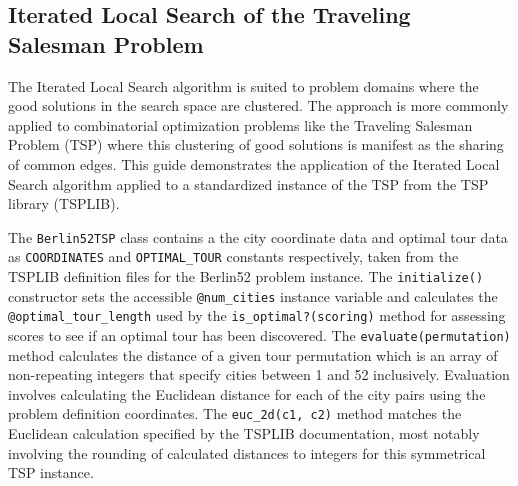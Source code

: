 \subsection{Iterated Local Search of the Traveling Salesman Problem}
The Iterated Local Search algorithm is suited to problem domains where the good solutions in the search space are clustered. The approach is more commonly applied to combinatorial optimization problems like the Traveling Salesman Problem (TSP) where this clustering of good solutions is manifest as the sharing of common edges. This guide demonstrates the application of the Iterated Local Search algorithm applied to a standardized instance of the TSP from the TSP library (TSPLIB).

The \texttt{Berlin52TSP} class contains a the city coordinate data and optimal tour data as \texttt{COORDINATES} and \texttt{OPTIMAL\_TOUR} constants respectively, taken from the TSPLIB definition files for the Berlin52 problem instance. The \texttt{initialize()} constructor sets the accessible \texttt{@num\_cities} instance variable and calculates the \texttt{@optimal\_tour\_length} used by the \texttt{is\_optimal?(scoring)} method for assessing scores to see if an optimal tour has been discovered. The \texttt{evaluate(permutation)} method calculates the distance of a given tour permutation which is an array of non-repeating integers that specify cities between 1 and 52 inclusively. Evaluation involves calculating the Euclidean distance for each of the city pairs using the problem definition coordinates. The \texttt{euc\_2d(c1, c2)} method matches the Euclidean calculation specified by the TSPLIB documentation, most notably involving the rounding of calculated distances to integers for this symmetrical TSP instance.

